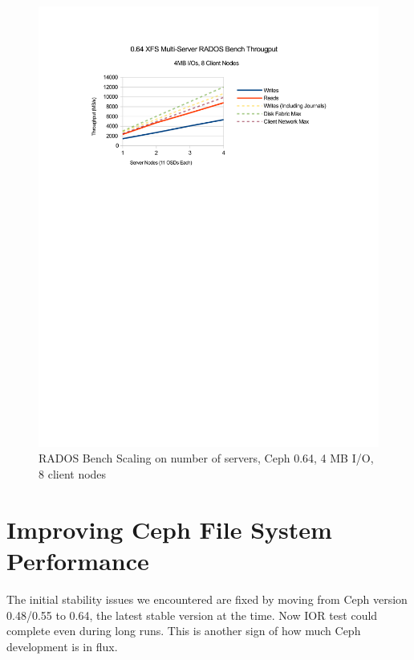 \documentclass{article}
\begin{document}

\begin{figure}[htb]
\centering
\includegraphics[width=5in]{rados-064-oss}
\caption{RADOS Bench Scaling on number of servers, Ceph 0.64, 4 MB I/O, 8 client
nodes}
\label{fig:rados-064-oss}
\end{figure}



\section{Improving Ceph File System Performance}
\label{sec:improve-ior}

The initial stability issues we encountered are fixed by moving from Ceph
version 0.48/0.55 to 0.64, the latest stable version at the time. Now IOR test
could complete even during long runs. This is another sign of how much Ceph
development is in flux.
\end{document}
